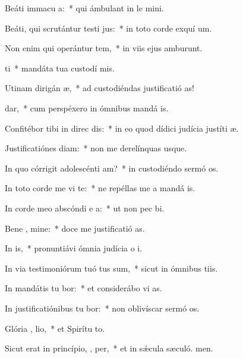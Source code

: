 \item Beáti immacu  a:~* qui ámbulant in le mini.
\item Beáti, qui scrutántur testi jus:~* in toto corde exquí um.
\item Non enim qui operántur tem,~* in viis ejus amburunt.
\item {} ti~* mandáta tua custodí mis.
\item Utinam dirigán  æ,~* ad custodiéndas justificatió as!
\item {}  dar,~* cum perspéxero in ómnibus mandá is.
\item Confitébor tibi in direc dis:~* in eo quod dídici judícia justíti æ.
\item Justificatiónes  diam:~* non me derelínquas usque.
\item In quo córrigit adolescénti  am?~* in custodiéndo sermó os.
\item In toto corde me vi te:~* ne repéllas me a mandá is.
\item In corde meo abscóndi e a:~* ut non pec bi.
\item Bene , mine:~* doce me justificatió as.
\item In  is,~* pronuntiávi ómnia judícia o i.
\item In via testimoniórum tuó tus sum,~* sicut in ómnibus tiis.
\item In mandátis tu bor:~* et considerábo vi as.
\item In justificatiónibus tu bor:~* non oblivíscar sermó os.
\item Glória ,  lio,~* et Spirítu to.
\item Sicut erat in princípio,  ,  per,~* et in sǽcula sæculó. men.
